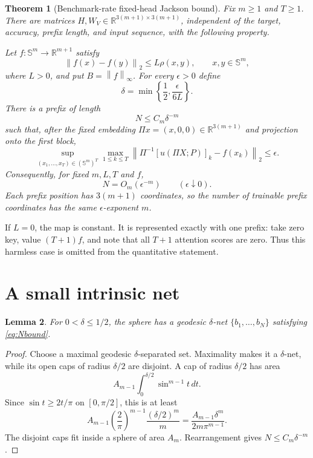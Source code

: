 \documentclass[11pt]{article}
\newtheorem{theorem}{Theorem}
\newtheorem{lemma}[theorem]{Lemma}
\newcommand{\R}{\mathbb R}
\newcommand{\Sph}{\mathbb S}
\newcommand{\norm}[1]{\left\lVert #1\right\rVert}
\begin{document}
\begin{theorem}[Benchmark-rate fixed-head Jackson bound]\label{thm:main}
Fix $m\ge1$ and $T\ge1$.  There are matrices
$H,W_V\in\R^{3(m+1)\times3(m+1)}$, independent of the target, accuracy,
prefix length, and input sequence, with the following property.

Let $f:\Sph^m\to\R^{m+1}$ satisfy
\[
 \norm{f(x)-f(y)}_2\le L\rho(x,y),\qquad x,y\in\Sph^m,
\]
where $L>0$, and put $B=\norm{f}_\infty$.  For every $\epsilon>0$ define
\[
 \delta=\min\left\{\frac12,\frac{\epsilon}{6L}\right\}.
\]
There is a prefix of length
\begin{equation}\label{eq:Nbound}
 N\le C_m\delta^{-m}
\end{equation}
such that, after the fixed embedding
$\Pi x=(x,0,0)\in\R^{3(m+1)}$ and projection onto the first block,
\begin{equation}\label{eq:uniform}
 \sup_{(x_1,\ldots,x_T)\in(\Sph^m)^T}
 \max_{1\le k\le T}
 \norm{\Pi^{-1}[u(\Pi X;P)]_k-f(x_k)}_2\le\epsilon.
\end{equation}
Consequently, for fixed $m,L,T$ and $f$,
\[
 N=O_m(\epsilon^{-m})\qquad(\epsilon\downarrow0).
\]
Each prefix position has $3(m+1)$ coordinates, so the number of trainable
prefix coordinates has the same $\epsilon$-exponent $m$.
\end{theorem}

If $L=0$, the map is constant.  It is represented exactly with one prefix:
take zero key, value $(T+1)f$, and note that all $T+1$ attention scores are
zero.  Thus this harmless case is omitted from the quantitative statement.

\section{A small intrinsic net}

\begin{lemma}\label{lem:net}
For $0<\delta\le1/2$, the sphere has a geodesic $\delta$-net
$\{b_1,\ldots,b_N\}$ satisfying \eqref{eq:Nbound}.
\end{lemma}

\begin{proof}
Choose a maximal geodesic $\delta$-separated set.  Maximality makes it a
$\delta$-net, while its open caps of radius $\delta/2$ are disjoint.  A cap of
radius $\delta/2$ has area
\[
 A_{m-1}\int_0^{\delta/2}\sin^{m-1}t\,dt.
\]
Since $\sin t\ge2t/\pi$ on $[0,\pi/2]$, this is at least
\[
 A_{m-1}\left(\frac2\pi\right)^{m-1}
 \frac{(\delta/2)^m}{m}
 =\frac{A_{m-1}\delta^m}{2m\pi^{m-1}}.
\]
The disjoint caps fit inside a sphere of area $A_m$.  Rearrangement gives
$N\le C_m\delta^{-m}$.
\end{proof}
\end{document}
